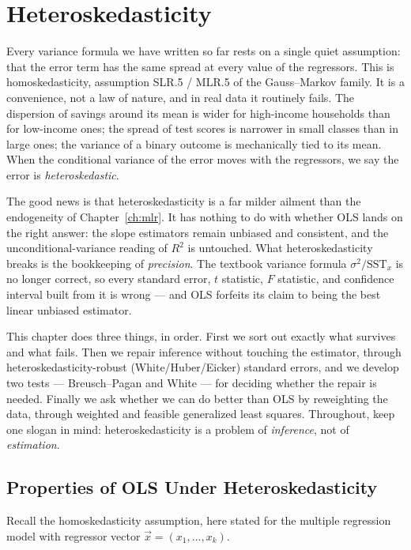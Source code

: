 \chapter{Heteroskedasticity}
\label{ch:hetero}

Every variance formula we have written so far rests on a single quiet assumption: that the error term has the same spread at every value of the regressors. This is homoskedasticity, assumption SLR.5 / MLR.5 of the Gauss--Markov family. It is a convenience, not a law of nature, and in real data it routinely fails. The dispersion of savings around its mean is wider for high-income households than for low-income ones; the spread of test scores is narrower in small classes than in large ones; the variance of a binary outcome is mechanically tied to its mean. When the conditional variance of the error moves with the regressors, we say the error is \emph{heteroskedastic}.

The good news is that heteroskedasticity is a far milder ailment than the endogeneity of Chapter~\ref{ch:mlr}. It has nothing to do with whether OLS lands on the right answer: the slope estimators remain unbiased and consistent, and the unconditional-variance reading of $R^2$ is untouched. What heteroskedasticity breaks is the bookkeeping of \emph{precision}. The textbook variance formula $\sigma^2/\text{SST}_x$ is no longer correct, so every standard error, $t$ statistic, $F$ statistic, and confidence interval built from it is wrong --- and OLS forfeits its claim to being the best linear unbiased estimator.

This chapter does three things, in order. First we sort out exactly what survives and what fails. Then we repair inference without touching the estimator, through heteroskedasticity-robust (White/Huber/Eicker) standard errors, and we develop two tests --- Breusch--Pagan and White --- for deciding whether the repair is needed. Finally we ask whether we can do better than OLS by reweighting the data, through weighted and feasible generalized least squares. Throughout, keep one slogan in mind: heteroskedasticity is a problem of \emph{inference}, not of \emph{estimation}.

\section{Properties of OLS Under Heteroskedasticity}

Recall the homoskedasticity assumption, here stated for the multiple regression model with regressor vector $\vec x = (x_1,\dots,x_k)$.

